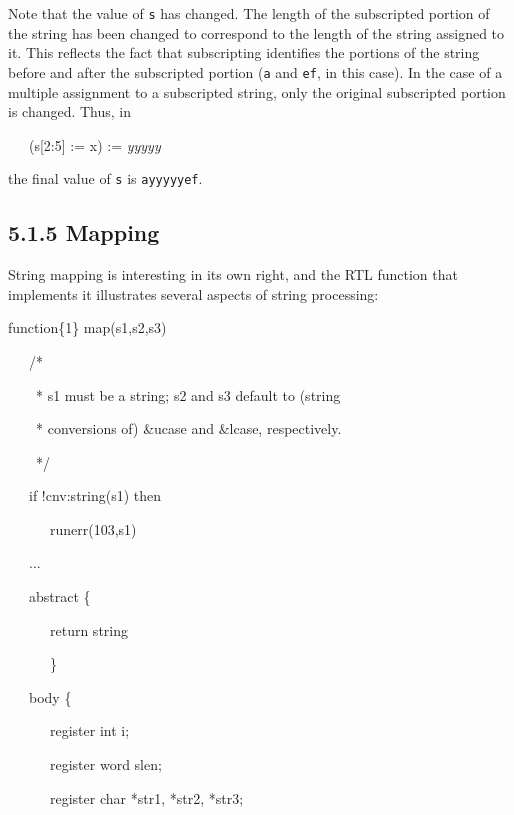Note that the value of \texttt{s} has changed. The length of the
subscripted portion of the string has been changed to correspond to
the length of the string assigned to it. This reflects the fact that
subscripting identifies the portions of the string before and after
the subscripted portion (\texttt{{\textquotedbl}a{\textquotedbl}} and
\texttt{{\textquotedbl}ef{\textquotedbl}}, in this case). In the case
of a multiple assignment to a subscripted string, only the original
subscripted portion is changed. Thus, in

{\ttfamily
\ \ \ (s[2:5] := {\textquotedbl}x{\textquotedbl}) := \textit{{\textquotedbl}yyyyy{\textquotedbl}}}

\noindent the final value of \texttt{s} is
\texttt{{\textquotedbl}ayyyyyef{\textquotedbl}}.

\subsection[5.1.5 Mapping]{5.1.5 Mapping}

String mapping is interesting in its own right, and the RTL function
that implements it illustrates several aspects of string processing:

{\ttfamily\mdseries
function\{1\} map(s1,s2,s3)}

{\ttfamily\mdseries
\ \ \ /*}

{\ttfamily\mdseries
\ \ \ \ * s1 must be a string; s2 and s3 default to (string }

{\ttfamily\mdseries
\ \ \ \ * conversions of) \&ucase and \&lcase, respectively.}

{\ttfamily\mdseries
\ \ \ \ */}

{\ttfamily\mdseries
\ \ \ if !cnv:string(s1) then}

{\ttfamily\mdseries
\ \ \ \ \ \ runerr(103,s1)}

{\ttfamily\mdseries
\ \ \ ...}

{\ttfamily\mdseries
\ \ \ abstract \{}

{\ttfamily\mdseries
\ \ \ \ \ \ return string}

{\ttfamily\mdseries
\ \ \ \ \ \ \}}

{\ttfamily\mdseries
\ \ \ body \{}

{\ttfamily\mdseries
\ \ \ \ \ \ register int i;}

{\ttfamily\mdseries
\ \ \ \ \ \ register word slen;}

{\ttfamily\mdseries
\ \ \ \ \ \ register char *str1, *str2, *str3;}

